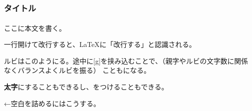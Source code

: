 \documentclass[twocolumn,titlepage]{tarticle}
\title{} %
\author{} %
\date{} %
\begin{document}

\maketitle %

\clearpage 

\tableofcontents

\clearpage

\part{} %

\section{} %

\section*{タイトル} 

\subsection{} %


ここに本文を書く。

一行開けて改行すると、\LaTeX に「改行する」と認識される。

ルビはこのようにる。途中に[g]を挟み込むことで、（親字やルビの文字数に関係なくバランスよくルビを振る）
こともになる。

\textbf{太字}にすることもできるし、をつけることもできる。

\noindent ←空白を詰めるにはこうする。


\begin{comment}
コメントの記述である。
これを挟むと間に何を書いても、生成ファイルに反映されなくなる。
これを挟まなくても、行頭に%
執筆や処理の上で気になった部分をメモするのに使える。
\end{comment}

\end{document}
